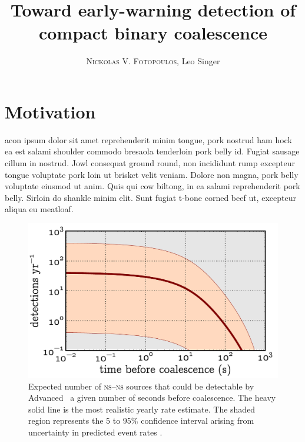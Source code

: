 \documentclass[portrait,plainboxedsections]{sciposter}
\title{Toward early-warning detection of compact binary coalescence}
\author{\textsc{Nickolas V. Fotopoulos}, Leo Singer}
\institute{LIGO Laboratory, California Institute of Technology}
\begin{document}

\maketitle

\begin{minipage}[t]{0.25\textwidth}

\section*{Motivation}

acon ipsum dolor sit amet reprehenderit minim tongue, pork nostrud
ham hock ea est salami shoulder commodo bresaola tenderloin pork belly id.
Fugiat sausage cillum in nostrud. Jowl consequat ground round, non incididunt
rump excepteur tongue voluptate pork loin ut brisket velit veniam. Dolore non
magna, pork belly voluptate eiusmod ut anim. Quis qui cow biltong, in ea salami
reprehenderit pork belly. Sirloin do shankle minim elit. Sunt fugiat t-bone
corned beef ut, excepteur aliqua eu meatloaf.
%
\begin{figure}[h]
\includegraphics[width=\textwidth]{figures/snr_in_time}
\caption{\label{fig:earlywarning}Expected number of \textsc{ns}--\textsc{ns}
sources that could be detectable by Advanced \LIGO\ a given number of seconds
before coalescence.  The heavy solid line is the most realistic yearly rate
estimate.  The shaded region represents the 5 to 95\% confidence interval
arising from uncertainty in predicted event rates \cite{Abadie:2010p10836}.}
\end{figure}
%
\begin{figure}[h]

\end{figure}
\end{minipage}
\end{document}
